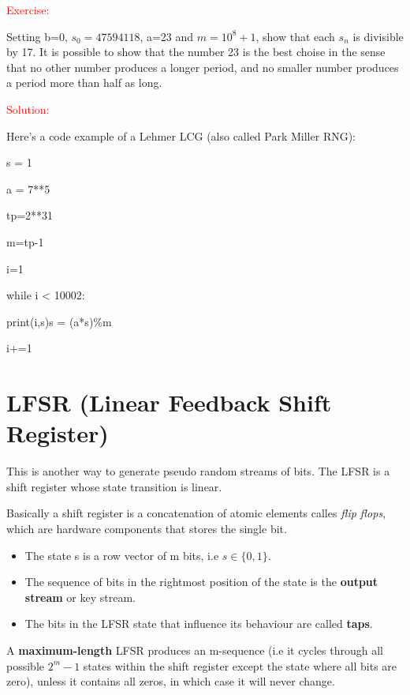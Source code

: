 \documentclass{article}
\begin{document}
\textcolor{red}{Exercise:}

Setting b=0, $s_0=47594118$, a=23 and $m=10^8+1$, show that each $s_n$ is divisible by 17. It is possible to show that the number 23 is the best choise in the sense that no other number produces a longer period, and no smaller number produces a period more than half as long.

\textcolor{red}{Solution:}


Here's a code example of a Lehmer LCG (also called Park Miller RNG):

s = 1

a = 7**5

tp=2**31

m=tp-1

i=1

while i < 10002:

\hspace{1cm}print(i,s)s = (a*s)\%m

\hspace{1cm}i+=1

\section{LFSR (Linear Feedback Shift Register)}
This is another way to generate pseudo random streams of bits. The LFSR is a shift register whose state transition is linear.

Basically a shift register is a concatenation of atomic elements calles \textit{flip flops}, which are hardware components that stores the single bit.
\begin{itemize}
    \item The state s is a row vector of m bits, i.e $s \in \{0,1\}$.
    \item The sequence of bits in the rightmost position of the state is the \textbf{output stream} or key stream.
    \item The bits in the LFSR state that influence its behaviour are called \textbf{taps}.
\end{itemize}
A \textbf{maximum-length} LFSR produces an m-sequence (i.e it cycles through all possible $2^m-1$ states within the shift register except the state where all bits are zero), unless it contains all zeros, in which case it will never change.
\end{document}
